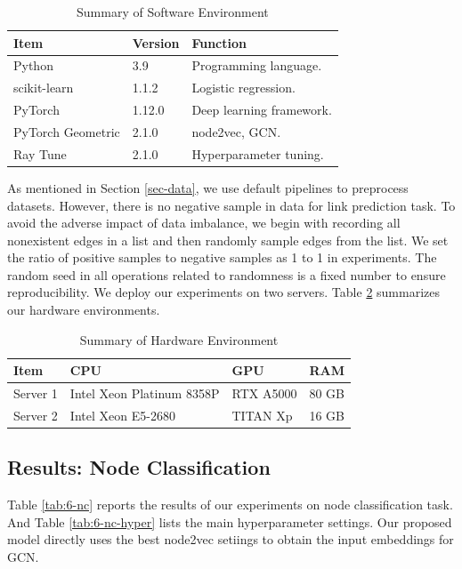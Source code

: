 \documentclass[sigconf]{acmart}
\begin{document}
\begin{table}[!ht]
    \centering
    \caption{Summary of Software Environment}
    \label{tab:6-software}
    \begin{tabular}{lll}
        \toprule
        \textbf{Item} & \textbf{Version} & \textbf{Function}\\
        \midrule
        Python & 3.9 & Programming language.\\
        scikit-learn & 1.1.2 & Logistic regression.\\
        PyTorch & 1.12.0 & Deep learning framework.\\
        PyTorch Geometric & 2.1.0 & node2vec, GCN.\\
        Ray Tune & 2.1.0 & Hyperparameter tuning.\\
        \bottomrule
    \end{tabular}
\end{table}

As mentioned in Section \ref{sec-data}, we use default pipelines to preprocess datasets. However, there is no negative sample in data for link prediction task. To avoid the adverse impact of data imbalance, we begin with recording all nonexistent edges in a list and then randomly sample edges from the list. We set the ratio of positive samples to negative samples as 1 to 1 in experiments. The random seed in all operations related to randomness is a fixed number to ensure reproducibility. We deploy our experiments on two servers. Table \ref{tab:6-hardware} summarizes our hardware environments.

\begin{table}[!ht]
    \centering
    \caption{Summary of Hardware Environment}
    \label{tab:6-hardware}
    \begin{tabular}{llll}
        \toprule
        \textbf{Item} & \textbf{CPU} & \textbf{GPU} & \textbf{RAM}\\
        \midrule
        Server 1 & Intel Xeon Platinum 8358P & RTX A5000 & 80 GB\\
        Server 2 & Intel Xeon E5-2680 & TITAN Xp & 16 GB\\
        \bottomrule
    \end{tabular}
\end{table}

\subsection{Results: Node Classification}
Table \ref{tab:6-nc} reports the results of our experiments on node classification task. And Table \ref{tab:6-nc-hyper} lists the main hyperparameter settings. Our proposed model directly uses the best node2vec setiings to obtain the input embeddings for GCN.
\end{document}
